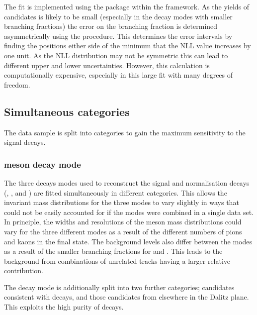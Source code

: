 The fit is implemented using the \roofit package within the \root framework. 
As the yields of candidates is likely to be small (especially in the \Dsp decay modes with smaller branching fractions) the error on the branching fraction is determined asymmetrically using the \minos procedure. This determines the error intervals by finding the positions either side of the minimum that the NLL value increases by one unit. As the NLL distribution may not be symmetric this can lead to different upper and lower uncertainties. However, this calculation is computationally expensive, especially in this large fit with many degrees of freedom.  


\subsection{Simultaneous categories}
\label{sec:B2DsPhi_fit_cats}

The data sample is split into categories to gain the maximum sensitivity to the signal decays.

\subsubsection{\Dsp meson decay mode} 
The three \Dsp decays modes used to reconstruct the signal and normalisation decays (\decay{\Dsp}{\Kp\Km\pip}, \decay{\Dsp}{\pip\pim\pip}, and \decay{\Dsp}{\Kp\pim\pip}) are fitted simultaneously in different categories. This allows the invariant mass distributions for the three modes to vary slightly in ways that could not be easily accounted for if the modes were combined in a single data set. In principle, the widths and resolutions of the \Bp meson mass distributions could vary for the three different modes as a result of the different numbers of pions and kaons in the final state. The background levels also differ between the modes as a result of the smaller branching fractions for \decay{\Dsp}{\pip\pim\pip} and \decay{\Dsp}{\Kp\pim\pip}. This leads to the background from combinations of unrelated tracks having a larger relative contribution.

The \decay{\Dsp}{\Kp\Km\pip} decay mode is additionally split into two further categories; candidates consistent with \decay{\Dsp}{\phiz\pip} decays, and those candidates from elsewhere in the \decay{\Dsp}{\Kp\Km\pip} Dalitz plane. This exploits the high purity of \decay{\Dsp}{\phiz\pip} decays. 

